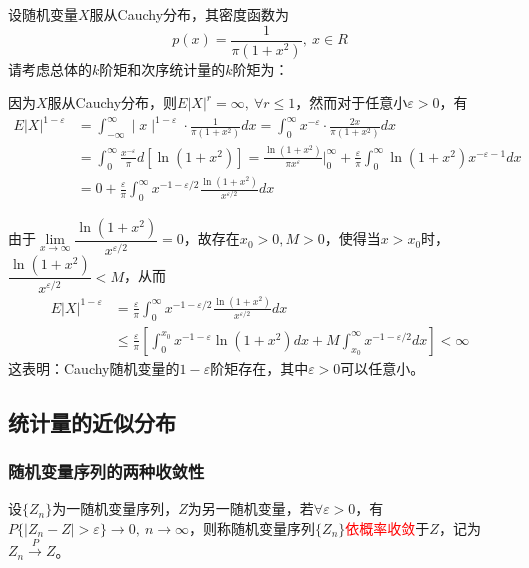 \begin{example}
    设随机变量$X$服从Cauchy分布，其密度函数为
    \[
        p(x) = \dfrac{1}{\pi(1+x^2)},\ x\in R
    \]
    请考虑总体的$k$阶矩和次序统计量的$k$阶矩为：

    因为$X$服从Cauchy分布，则$E|X|^r=\infty,\ \forall r\leqslant 1 $，然而对于任意小$\varepsilon>0$，有
    \[
        \begin{aligned}
            E\left|X\right|^{1-\varepsilon}& =\int_{-\infty}^{\infty}\mid x\mid^{1-\varepsilon}\cdot\frac{1}{\pi(1+x^{2})}dx=\int_{0}^{\infty}x^{-\varepsilon}\cdot\frac{2x}{\pi(1+x^{2})}dx  \\
            &=\int_{0}^{\infty}\frac{x^{-\varepsilon}}{\pi}d[\ln(1+x^{2})]=\frac{\ln(1+x^{2})}{\pi x^{\varepsilon}}\Bigg|_{0}^{\infty}+\frac{\varepsilon}{\pi}\int_{0}^{\infty}\ln(1+x^{2})x^{-\varepsilon-1}dx \\
            &=0+\frac{\varepsilon}{\pi}\int_{0}^{\infty}x^{-1-\varepsilon/2}\frac{\ln(1+x^{2})}{x^{\varepsilon/2}}dx
            \end{aligned}
    \]

    由于$\lim\limits_{x\rightarrow \infty}\dfrac{\ln(1+x^2)}{x^{\varepsilon/2}}=0$，故存在$x_0>0,M>0$，使得当$x>x_0$时，$\dfrac{\ln(1+x^2)}{x^{\varepsilon/2}}<M$，从而
    \[
        \begin{aligned}
            E|X|^{1-\varepsilon}& =\frac{\varepsilon}{\pi}\int_{0}^{\infty}x^{-1-\varepsilon/2}\frac{\ln(1+x^{2})}{x^{\varepsilon/2}}dx  \\
            &\leq\frac{\varepsilon}{\pi}[\int_{0}^{x_{0}}x^{-1-\varepsilon}\ln(1+x^{2})dx+M\int_{x_{0}}^{\infty}x^{-1-\varepsilon/2}dx]<\infty 
            \end{aligned}
    \]
    这表明：Cauchy随机变量的$1-\varepsilon$阶矩存在，其中$\varepsilon>0$可以任意小。
\end{example}
\begin{remark}
        
\end{remark}
\subsection{统计量的近似分布}
\subsubsection{随机变量序列的两种收敛性}
\begin{definition}[依概率收敛]
    设$\{ Z_n \}$为一随机变量序列，$Z$为另一随机变量，若$\forall \varepsilon>0$，有$P\{ |Z_n-Z|>\varepsilon \}\rightarrow 0,\ n\rightarrow \infty$，则称随机变量序列$\{ Z_n \}$\textcolor{red}{依概率收敛}于$Z$，记为$Z_n \overset{P}{\rightarrow} Z$。
\end{definition}

